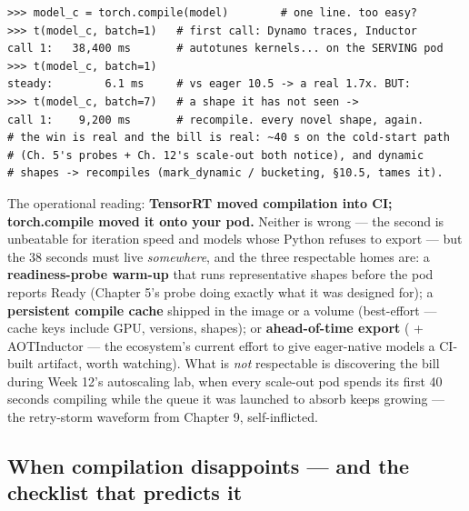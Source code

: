 \begin{terminalbox}
\begin{Verbatim}[breaklines=true,breakanywhere=true,fontsize=\small,formatcom=\color{tbbtermfg},codes=\tbbcodeactive]
>>> model_c = torch.compile(model)        # one line. too easy?
>>> t(model_c, batch=1)   # first call: Dynamo traces, Inductor
call 1:   38,400 ms       # autotunes kernels... on the SERVING pod
>>> t(model_c, batch=1)
steady:        6.1 ms     # vs eager 10.5 -> a real 1.7x. BUT:
>>> t(model_c, batch=7)   # a shape it has not seen ->
call 1:    9,200 ms       # recompile. every novel shape, again.
# the win is real and the bill is real: ~40 s on the cold-start path
# (Ch. 5's probes + Ch. 12's scale-out both notice), and dynamic
# shapes -> recompiles (mark_dynamic / bucketing, §10.5, tames it).
\end{Verbatim}
\end{terminalbox}

The operational reading: \textbf{TensorRT moved compilation into CI; torch.compile moved it onto your pod.} Neither is wrong — the second is unbeatable for iteration speed and models whose Python refuses to export — but the 38 seconds must live \textit{somewhere}, and the three respectable homes are: a \textbf{readiness-probe warm-up} that runs representative shapes before the pod reports Ready (Chapter 5's probe doing exactly what it was designed for); a \textbf{persistent compile cache} shipped in the image or a volume (best-effort — cache keys include GPU, versions, shapes); or \textbf{ahead-of-time export} ( + AOTInductor — the ecosystem's current effort to give eager-native models a CI-built artifact, worth watching). What is \textit{not} respectable is discovering the bill during Week 12's autoscaling lab, when every scale-out pod spends its first 40 seconds compiling while the queue it was launched to absorb keeps growing — the retry-storm waveform from Chapter 9, self-inflicted.

\subsection*{When compilation disappoints — and the checklist that predicts it}

